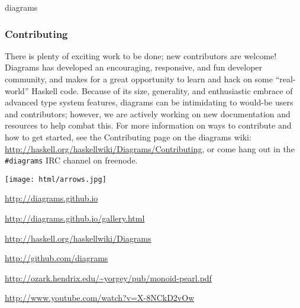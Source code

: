\begin{hcarentry}{diagrams}
\subsubsection*{Contributing}

There is plenty of exciting work to be done; new contributors are welcome!
Diagrams has developed an encouraging, responsive, and fun developer
community, and makes for a great opportunity to learn and hack on some
``real-world'' Haskell code. Because of its size, generality, and enthusiastic
embrace of advanced type system features, diagrams can be intimidating to
would-be users and contributors; however, we are actively working on new
documentation and resources to help combat this. For more information on ways
to contribute and how to get started, see the Contributing page on the
diagrams wiki: \url{http://haskell.org/haskellwiki/Diagrams/Contributing}, or
come hang out in the \texttt{\#diagrams} IRC channel on freenode.

\begin{center}
\texttt{[image: html/arrows.jpg]}
\end{center}

\FurtherReading
\begin{compactitem}
\item \url{http://diagrams.github.io}
\item \url{http://diagrams.github.io/gallery.html}
\item \url{http://haskell.org/haskellwiki/Diagrams}
\item \url{http://github.com/diagrams}
\item \url{http://ozark.hendrix.edu/~yorgey/pub/monoid-pearl.pdf}
\item \url{http://www.youtube.com/watch?v=X-8NCkD2vOw}
\end{compactitem}
\end{hcarentry}
